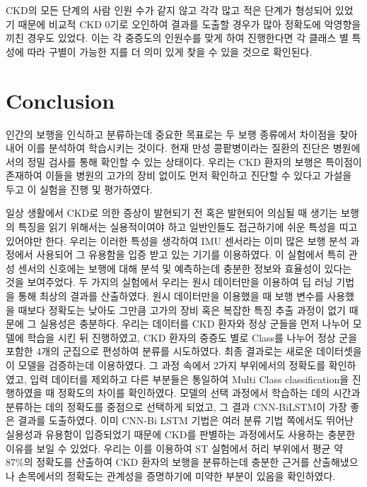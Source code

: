 \documentclass{article}
\begin{document}
CKD의 모든 단계의 사람 인원 수가 같지 않고 각각 많고 적은 단계가
형성되어 있었기 때문에 비교적 CKD 0기로 오인하여 결과를 도출할 경우가
많아 정확도에 악영향을 끼친 경우도 있었다. 이는 각 중증도의 인원수를
맞게 하여 진행한다면 각 클래스 별 특성에 따라 구별이 가능한 지를 더 의미
있게 찾을 수 있을 것으로 확인된다.

\section{Conclusion}

인간의 보행을 인식하고 분류하는데 중요한 목표로는 두 보행 종류에서
차이점을 찾아내어 이를 분석하여 학습시키는 것이다. 현재 만성
콩팥병이라는 질환의 진단은 병원에서의 정밀 검사를 통해 확인할 수 있는
상태이다. 우리는 CKD 환자의 보행은 특이점이 존재하여 이들을 병원의
고가의 장비 없이도 먼저 확인하고 진단할 수 있다고 가설을 두고 이 실험을
진행 및 평가하였다.

일상 생활에서 CKD로 의한 증상이 발현되기 전 혹은 발현되어 의심될 때
생기는 보행의 특징을 읽기 위해서는 실용적이여야 하고 일반인들도
접근하기에 쉬운 특성을 띠고 있어야만 한다. 우리는 이러한 특성을 생각하여
IMU 센서라는 이미 많은 보행 분석 과정에서 사용되어 그 유용함을 입증 받고
있는 기기를 이용하였다. 이 실험에서 특히 관성 센서의 신호에는 보행에
대해 분석 및 예측하는데 충분한 정보와 효율성이 있다는 것을 보여주었다.
두 가지의 실험에서 우리는 원시 데이터만을 이용하여 딥 러닝 기법을 통해
최상의 결과를 산출하였다. 원시 데이터만을 이용했을 때 보행 변수를
사용했을 때보다 정확도는 낮아도 그만큼 고가의 장비 혹은 복잡한 특징 추출
과정이 없기 때문에 그 실용성은 충분하다. 우리는 데이터를 CKD 환자와 정상
군들을 먼저 나누어 모델에 학습을 시킨 뒤 진행하였고, CKD 환자의 중증도
별로 Class를 나누어 정상 군을 포함한 4개의 군집으로 편성하여 분류를
시도하였다. 최종 결과로는 새로운 데이터셋을 이 모델을 검증하는데
이용하였다. 그 과정 속에서 2가지 부위에서의 정확도를 확인하였고, 입력
데이터를 제외하고 다른 부분들은 통일하여 Multi Class classification을
진행하였을 때 정확도의 차이를 확인하였다. 모델의 선택 과정에서 학습하는
데의 시간과 분류하는 데의 정확도를 중점으로 선택하게 되었고, 그 결과
CNN-BiLSTM이 가장 좋은 결과를 도출하였다. 이미 CNN-Bi LSTM 기법은 여러
분류 기법 쪽에서도 뛰어난 실용성과 유용함이 입증되었기 때문에 CKD를
판별하는 과정에서도 사용하는 충분한 이유를 보일 수 있었다. 우리는 이를
이용하여 ST 실험에서 허리 부위에서 평균 약 87\%의 정확도를 산출하여 CKD
환자의 보행을 분류하는데 충분한 근거를 산출해냈으나 손목에서의 정확도는
관계성을 증명하기에 미약한 부분이 있음을 확인하였다.
\end{document}
